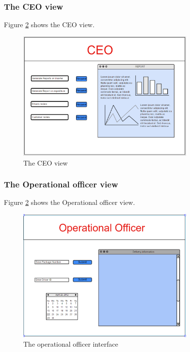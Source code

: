 \documentclass[paper=a4, fontsize=11pt]{scrartcl} %
\numberwithin{equation}{section} %
\numberwithin{figure}{section} %
\numberwithin{table}{section} %
\begin{document}
\subsubsection{The CEO view}
Figure \ref{Sender} shows the CEO view.
\begin{figure}[h!]
\centering
\includegraphics[width=3.5in]{pictures/CEO.png}
\caption{The CEO view}
\label{Sender}
\end{figure}

\subsubsection{The Operational officer view}
Figure \ref{Sender} shows the Operational officer view.
\begin{figure}[h!]
\centering
\includegraphics[width=3.5in]{pictures/operational.png}
\caption{The operational officer interface}
\label{Sender}
\end{figure}
\end{document}
